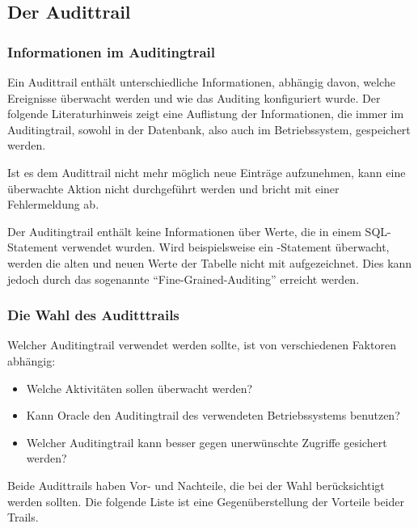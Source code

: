      \subsection{Der Audittrail}
        \subsubsection{Informationen im Auditingtrail}
          Ein Audittrail enth\"alt unterschiedliche Informationen, abh\"angig davon, welche Ereignisse \"uberwacht werden und wie das Auditing konfiguriert wurde. Der folgende Literaturhinweis zeigt eine Auflistung der Informationen, die immer im Auditingtrail, sowohl in der Datenbank, also auch im Betriebssystem, gespeichert werden.

          \begin{literaturinternet}
            \item \cite{BCGIDBFI}
          \end{literaturinternet}

          Ist es dem Audittrail nicht mehr m\"oglich neue Eintr\"age aufzunehmen, kann eine \"uberwachte Aktion nicht durchgef\"uhrt werden und bricht mit einer Fehlermeldung ab.

          Der Auditingtrail enth\"alt keine Informationen \"uber Werte, die in einem SQL-Statement verwendet wurden. Wird beispielsweise ein -Statement \"uberwacht, werden die alten und neuen Werte der Tabelle nicht mit aufgezeichnet. Dies kann jedoch durch das sogenannte \enquote{Fine-Grained-Auditing} erreicht werden.
        \subsubsection{Die Wahl des Auditttrails}
          Welcher Auditingtrail verwendet werden sollte, ist von verschiedenen Faktoren abh\"angig:
          \begin{itemize}
            \item Welche Aktivit\"aten sollen \"uberwacht werden?
            \item Kann Oracle den Auditingtrail des verwendeten Betriebssystems benutzen?
            \item Welcher Auditingtrail kann besser gegen unerw\"unschte Zugriffe gesichert werden?
          \end{itemize}
          Beide Audittrails haben Vor- und Nachteile, die bei der Wahl ber\"ucksichtigt werden sollten. Die folgende Liste ist eine Gegen\"uberstellung der Vorteile beider Trails.


